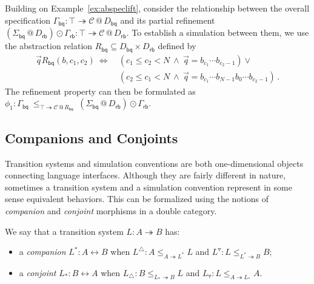 \documentclass[acmsmall,screen,review,anonymous]{acmart}
\newcommand{\kw}[1]{\ensuremath{ \mathsf{#1} }}
\begin{document}
\begin{example} \label{ex:bqcorrect} %
Building on Example~\ref{ex:abspeclift},
consider the relationship between
the overall specification $
  \Gamma_\kw{bq} :
    \top \twoheadrightarrow \mathcal{C} \mathbin@ D_\kw{bq}
$
and its partial refinement
$
  (\Sigma_\kw{bq} \mathbin@ D_\kw{rb}) \odot \Gamma_\kw{rb} :
    \top \twoheadrightarrow \mathcal{C} \mathbin@ D_\kw{rb}
$.
To establish a simulation between them,
we use the abstraction relation
$R_\kw{bq} \subseteq D_\kw{bq} \times D_\kw{rb}$
defined by
\begin{align*}
  \vec{q} \mathrel{R_\kw{bq}} (b, c_1, c_2) \:\Leftrightarrow\: {}
    & (c_1 \le c_2 < N \:\wedge\: \vec{q} = b_{c_1} \cdots b_{c_2-1}) \vee {} \\
    & (c_2 \le c_1 < N \:\wedge\: \vec{q} = b_{c_1} \cdots b_{N-1} b_0 \cdots b_{c_2 - 1})
  \,.
\end{align*}
The refinement property can then be formulated as
$
  \phi_1 :
  \Gamma_\kw{bq}
  \:\le_{\top \twoheadrightarrow \mathcal{C} \mathbin@ R_\kw{bq}}\:
  (\Sigma_\kw{bq} \mathbin@ D_\kw{rb}) \odot
  \Gamma_\kw{rb}
$.
\end{example}

\subsection{Companions and Conjoints} %

Transition systems and simulation conventions
are both one-dimensional objects
connecting language interfaces.
Although
they are fairly different in nature,
sometimes
a transition system and a simulation convention
represent in some sense equivalent behaviors.
This
can be formalized using the notions of
\emph{companion} and \emph{conjoint}
morphisms in a double category.

\begin{definition} %
We say that a transition system $L : A \twoheadrightarrow B$ has:
\begin{itemize}
  \item a \emph{companion} $L^* : A \leftrightarrow B$ when
    $L^\triangle : A \le_{A \twoheadrightarrow L^*} L$
    and
    $L^\triangledown : L \le_{L^* \twoheadrightarrow B} B$;
  \item a \emph{conjoint} $L_* : B \leftrightarrow A$ when
    $L_\triangle : B \le_{L_* \twoheadrightarrow B} L$
    and
    $L_\triangledown : L \le_{A \twoheadrightarrow L_*} A$.
\end{itemize}
\end{definition}
\end{document}
